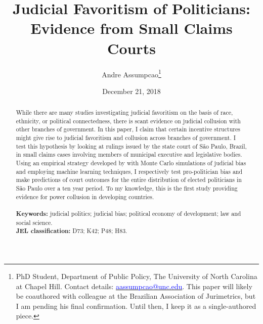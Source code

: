 \documentclass[11pt]{article}
\begin{document}
\begin{titlepage}
\title{Judicial Favoritism of Politicians: Evidence from Small Claims Courts}
\author{Andre Assumpcao\thanks{PhD Student, Department of Public Policy, The University of North Carolina at Chapel Hill. Contact details: \href{mailto:aassumpcao@unc.edu}{\textcolor{blue}{aassumpcao@unc.edu}}. This paper will likely be coauthored with colleague at the Brazilian Association of Jurimetrics, but I am pending his final confirmation. Until then, I keep it as a single-authored piece.}}
\date{December 21, 2018}

\maketitle

\begin{abstract}
\noindent While there are many studies investigating judicial favoritism on the basis of race, ethnicity, or political connectedness, there is scant evidence on judicial collusion with other branches of government. In this paper, I claim that certain incentive structures might give rise to judicial favoritism and collusion across branches of government. I test this hypothesis by looking at rulings issued by the state court of São Paulo, Brazil, in small claims cases involving members of municipal executive and legislative bodies. Using an empirical strategy developed by \citet{AbramsJudgesVaryTheir2012} with Monte Carlo simulations of judicial bias and employing machine learning techniques, I respectively test pro-politician bias and make predictions of court outcomes for the entire distribution of elected politicians in São Paulo over a ten year period. To my knowledge, this is the first study providing evidence for power collusion in developing countries. \\
\vspace{0in} \\
\noindent\textbf{Keywords:} judicial politics; judicial bias; political economy of development; law and social science. \\

\noindent\textbf{JEL classification:} D73; K42; P48; H83. \\

\vspace{0in}
\bigskip

\end{abstract}

\setcounter{page}{0}

\thispagestyle{empty}

\end{titlepage}
\end{document}
